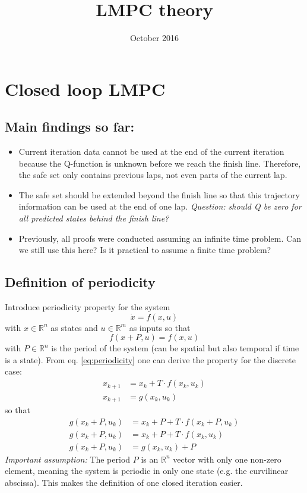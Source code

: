 \documentclass{article}
\title{LMPC theory}
\author{}
\date{October 2016}
\begin{document}

\section{Closed loop LMPC}
\subsection{Main findings so far:}
\begin{itemize}
\item Current iteration data cannot be used at the end of the current iteration because the Q-function is unknown before we reach the finish line. Therefore, the safe set only contains previous laps, not even parts of the current lap.
\item The safe set should be extended beyond the finish line so that this trajectory information can be used at the end of one lap. \emph{Question: should Q be zero for all predicted states behind the finish line?}
\item Previously, all proofs were conducted assuming an infinite time problem. Can we still use this here? Is it practical to assume a finite time problem?
\end{itemize}
\subsection{Definition of periodicity}
Introduce periodicity property for the system
\begin{equation}
\dot x = f(x,u)
\end{equation}
with $x\in \mathbb{R}^n$ as states and $u\in \mathbb{R}^m$ as inputs so that
\begin{equation}\label{eq:periodicity}
f(x+P,u) = f(x,u)
\end{equation}
with $P\in \mathbb{R}^n$ is the period of the system (can be spatial but also temporal if time is a state).
From eq. \ref{eq:periodicity} one can derive the property for the discrete case:
\begin{align}
x_{k+1} &= x_k + T\cdot f(x_k,u_k)\\
x_{k+1} &= g(x_k,u_k)
\end{align}
so that
\begin{align}
g(x_k+P,u_k) &= x_k+P + T\cdot f(x_k+P,u_k)\\
g(x_k+P,u_k) &= x_k+P + T\cdot f(x_k,u_k)\\
g(x_k+P,u_k) &= g(x_k,u_k)+P
\end{align}
\emph{Important assumption:} The period $P$ is an $\mathbb{R}^n$ vector with only one non-zero element, meaning the system is periodic in only one state (e.g. the curvilinear abscissa). This makes the definition of one closed iteration easier.
\end{document}
